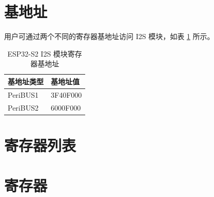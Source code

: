 \documentclass[main\_\_CN.tex]{subfiles}
\begin{document}
\section{基地址}\label{Section:Register Base Address}

用户可通过两个不同的寄存器基地址访问 I2S 模块，如表 \ref{table:clock_pol_slave} 所示。

\begin{table}[H]
    \centering
    \caption{ESP32-S2 I2S 模块寄存器基地址}
    \label{table:clock_pol_slave}
    \begin{tabular}[c]{|p{2.5cm}|p{3.5cm}|}
    \hline
    \rowcolor{lightgray}
    基地址类型 & 基地址值\\
    \hline

    PeriBUS1 &  \hexprefix{}3F40F000 \\ \hline

    PeriBUS2 &  \hexprefix{}6000F000 \\  \hline

    \end{tabular}
\end{table}

\hypertarget{i2s-reg-summ}{}
\section{寄存器列表}


\section{寄存器}\label{I2SRegister}

\end{document}
